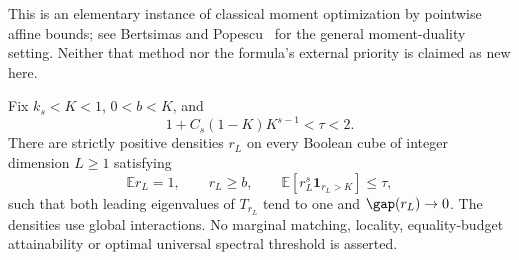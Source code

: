 This is an elementary instance of classical moment optimization by
pointwise affine bounds; see Bertsimas and Popescu~\cite{BertsimasPopescu}
for the general moment-duality setting. Neither that method nor the
formula's external priority is claimed as new here.

\begin{theorem}
\label{thm:background-collapse}
Fix $k_s<K<1$, $0<b<K$, and
\[
 1+C_s(1-K)K^{s-1}<\tau<2.
\]
There are strictly positive densities $r_L$ on every Boolean cube
of integer dimension $L\ge1$ satisfying
\[
 \mathbb E r_L=1,\qquad r_L\ge b,\qquad
 \mathbb E[r_L^s\mathbf1_{r_L>K}]\le\tau,
\]
such that both leading eigenvalues of $T_{r_L}$ tend to one and
$\gap(r_L)\to0$. The densities use global interactions. No marginal
matching, locality, equality-budget attainability or optimal universal
spectral threshold is asserted.
\end{theorem}

